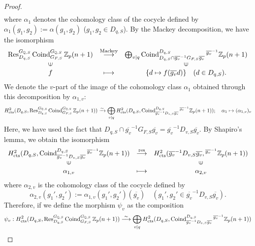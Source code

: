 \documentclass{article}
\numberwithin{equation}{section} %
\begin{document}
\begin{proof}
\[\begin{array}{ccc}
\end{array}
\]
where $\alpha_1$ denotes the cohomology class of the cocycle defined by $\alpha_1(g_1,g_2) := \alpha(g_1,g_2)$ ($g_1,g_2 \in D_{q,S}$). By the Mackey decomposition, we have the isomorphism
\[
  \begin{array}{ccc}
\operatorname{Res}_{D_{q,S}}^{G_{\mathbb{Q},S}}\operatorname{Coind}_{G_{F,S}}^{G_{\mathbb{Q},S}}\mathbb{Z}_p(n+1) & \stackrel{\mathrm{Mackey}}{\longrightarrow} &  \bigoplus_{v \mid q} \operatorname{Coind}_{D_{q,S} \cap \overline{g_v}^{-1}G_{F,S}\overline{g_v}}^{D_{q,S}}{}^{\overline{g_v}^{-1}}\mathbb{Z}_p(n+1)\\
 \rotatebox{90}{$\in$} & & \rotatebox{90}{$\in$}\\
f &\longmapsto  & \{d \mapsto f(\overline{g_v}d)\} \quad (d \in D_{q,S}).
\end{array}
\]
We denote the $v$-part of the image of the cohomology class $\alpha_1$ obtained through this decomposition by $\alpha_{1,v}$:
\[
  H_{\rm cts}^2(D_{q,S},\operatorname{Res}_{D_{q,S}}^{G_{\mathbb{Q},S}}\operatorname{Coind}_{G_{F,S}}^{G_{\mathbb{Q},S}}\mathbb{Z}_p(n+1)) \xrightarrow{\sim} \bigoplus_{v \mid q} H_{\rm cts}^2(D_{q,S},\operatorname{Coind}_{\overline{g_v}^{-1}D_{v,S}\overline{g_v}}^{D_{q,S}}{}^{\overline{g_v}^{-1}}\mathbb{Z}_p(n+1)); \quad \alpha_1 \mapsto (\alpha_{1,v})_v
\]
Here, we have used the fact that $D_{q,S} \cap \overline{g_v}^{-1}G_{F,S}\overline{g_v} = \overline{g_v}^{-1}D_{v,S}\overline{g_v}$. By Shapiro's lemma, we obtain the isomorphism
\[
  \begin{array}{ccc}
H_{\rm cts}^2(D_{q,S},\operatorname{Coind}_{\overline{g_v}^{-1}D_{v,S}\overline{g_v}}^{D_{q,S}}{}^{\overline{g_v}^{-1}}\mathbb{Z}_p(n+1)) & \stackrel{\mathrm{res}}{\longrightarrow} &  H_{\rm cts}^2(\overline{g_v}^{-1}D_{v,S}\overline{g_v}, {}^{\overline{g_v}^{-1}}\mathbb{Z}_p(n+1))\\
 \rotatebox{90}{$\in$} & & \rotatebox{90}{$\in$}\\
\alpha_{1,v} &\longmapsto  & \alpha_{2,v}
\end{array}
\]
where $\alpha_{2,v}$ is the cohomology class of the cocycle defined by
\[
  \alpha_{2,v}(g_1',g_2') := \alpha_{1,v}(g_1',g_2')(\overline{g_v}) \quad (g_1',g_2' \in \overline{g_v}^{-1}D_{v,S}\overline{g_v}).
\]
Therefore, if we define the morphism $\psi_v$ as the composition
\begin{align*}
  \psi_v: H_{\rm cts}^2(D_{q,S},\operatorname{Res}_{D_{q,S}}^{G_{\mathbb{Q},S}}\operatorname{Coind}_{G_{F,S}}^{G_{\mathbb{Q},S}}\mathbb{Z}_p(n+1)) &\overset{\sim}{\longrightarrow} \bigoplus_{v \mid q} H_{\rm cts}^2(D_{q,S},\operatorname{Coind}_{\overline{g_v}^{-1}D_{v,S}\overline{g_v}}^{D_{q,S}}{}^{\overline{g_v}^{-1}}\mathbb{Z}_p(n+1)) \\ 

\end{align*}
\end{proof}
\end{document}
